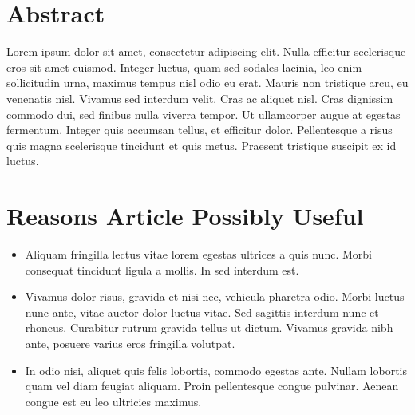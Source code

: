 \documentclass[10pt,letterpaper,twocolumn,landscape]{article}
\begin{document}


\thispagestyle{fancy} %



\section*{Abstract} %

Lorem ipsum dolor sit amet, consectetur adipiscing elit. Nulla efficitur scelerisque eros sit amet euismod. Integer luctus, quam sed sodales lacinia, leo enim sollicitudin urna, maximus tempus nisl odio eu erat. Mauris non tristique arcu, eu venenatis nisl. Vivamus sed interdum velit. Cras ac aliquet nisl. Cras dignissim commodo dui, sed finibus nulla viverra tempor. Ut ullamcorper augue at egestas fermentum. Integer quis accumsan tellus, et efficitur dolor. Pellentesque a risus quis magna scelerisque tincidunt et quis metus. Praesent tristique suscipit ex id luctus.


\section{Reasons Article Possibly Useful} %

\begin{itemize}\itemsep0.5pt{\renewcommand{\labelitemi}{$\square$}}
	\item Aliquam fringilla lectus vitae lorem egestas ultrices a quis nunc. Morbi consequat tincidunt ligula a mollis. In sed interdum est. 
    \item Vivamus dolor risus, gravida et nisi nec, vehicula pharetra odio. Morbi luctus nunc ante, vitae auctor dolor luctus vitae. Sed sagittis interdum nunc et rhoncus. Curabitur rutrum gravida tellus ut dictum. Vivamus gravida nibh ante, posuere varius eros fringilla volutpat. 
    \item In odio nisi, aliquet quis felis lobortis, commodo egestas ante. Nullam lobortis quam vel diam feugiat aliquam. Proin pellentesque congue pulvinar. Aenean congue est eu leo ultricies maximus. 
\end{itemize}
\end{document}
